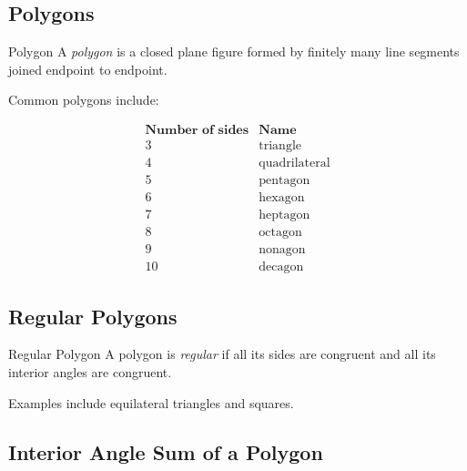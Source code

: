 \subsection{Polygons}
\label{subsec:euclidean-polygons}

\begin{definitionbox}{Polygon}
A \emph{polygon} is a closed plane figure formed by finitely many line
segments joined endpoint to endpoint.
\end{definitionbox}

Common polygons include:

\[
\begin{array}{c|c}
\textbf{Number of sides} & \textbf{Name}\\
\hline
3 & \text{triangle}\\
4 & \text{quadrilateral}\\
5 & \text{pentagon}\\
6 & \text{hexagon}\\
7 & \text{heptagon}\\
8 & \text{octagon}\\
9 & \text{nonagon}\\
10 & \text{decagon}
\end{array}
\]

\subsection{Regular Polygons}
\label{subsec:regular-polygons}

\begin{definitionbox}{Regular Polygon}
A polygon is \emph{regular} if all its sides are congruent and all its
interior angles are congruent.
\end{definitionbox}

Examples include equilateral triangles and squares.

\subsection{Interior Angle Sum of a Polygon}
\label{subsec:polygon-interior-angle-sum}

